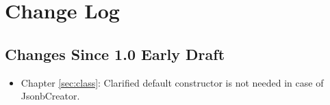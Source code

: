 \chapter{Change Log}

\section{Changes Since 1.0 Early Draft}

\begin{itemize}
\item Chapter \ref{sec:class}: Clarified default constructor is not needed in case of JsonbCreator.
\end{itemize}
